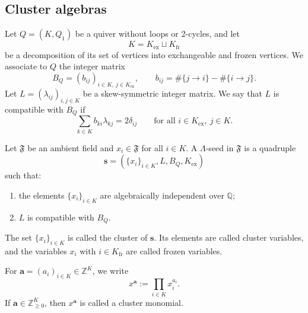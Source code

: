 \documentclass[12pt, reqno]{amsart}
\theoremstyle{plain}
\theoremstyle{definition}
\numberwithin{equation}{section}
\begin{document}
\subsection{Cluster algebras}

Let \(Q=(K,Q_1)\) be a quiver without loops or 2-cycles, and let
\[
K=K_{\operatorname{ex}}\sqcup K_{\operatorname{fr}}
\]
be a decomposition of its set of vertices into exchangeable and frozen vertices.
We associate to \(Q\) the integer matrix
\begin{equation}\label{eq_exchange_matrix}
B_Q=(b_{ij})_{i\in K,\ j\in K_{\operatorname{ex}}},
\qquad
b_{ij}=\#\{j\to i\}-\#\{i\to j\}.
\end{equation}
Let \(L=(\lambda_{ij})_{i,j\in K}\) be a skew-symmetric integer matrix. We say
that \(L\) is compatible with \(B_Q\) if
\[
\sum_{k\in K} b_{ki}\lambda_{kj}=2\delta_{ij}
\qquad
\text{for all } i\in K_{\operatorname{ex}},\ j\in K.
\]

Let \(\mathfrak F\) be an ambient field and $x_i\in \mathfrak F$ for all $i\in K$. A \(\Lambda\)-seed in \(\mathfrak F\) is a quadruple
\[
\mathbf s=(\{x_i\}_{i\in K},L,B_Q,K_{\operatorname{ex}})
\]
such that:
\begin{enumerate}
\item the elements \(\{x_i\}_{i\in K}\) are algebraically independent over
\(\mathbb Q\);
\item \(L\) is compatible with \(B_Q\).
\end{enumerate}
The set \(\{x_i\}_{i\in K}\) is called the cluster of \(\mathbf s\). Its elements
are called cluster variables, and the variables \(x_i\) with
\(i\in K_{\operatorname{fr}}\) are called frozen variables.

For \(\mathbf a=(a_i)_{i\in K}\in \mathbb Z^K\), we write
\[
x^{\mathbf a}:=\prod_{i\in K}x_i^{a_i}.
\]
If \(\mathbf a\in \mathbb Z_{\ge 0}^K\), then \(x^{\mathbf a}\) is called a
cluster monomial.
\end{document}
